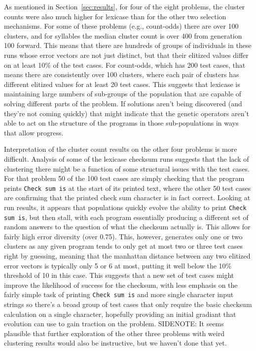As mentioned in Section~\ref{sec:results}, for four of the eight problems, the cluster counts were
also much higher for lexicase than for the other two selection mechanisms. For some of these problems
(e.g., count-odds) there are over 100 clusters, and for syllables the median cluster count is over 400
from generation 100 forward. This means that there are hundreds of groups of individuals in these runs
whose error vectors are not just distinct, but that their elitized values differ on at least 10\%
of the test cases. For count-odds, which has 200 test cases, that means there are consistently over
100 clusters, where each pair of clusters has different elitized values for at least 20 test cases.
This suggests that lexicase is maintaining large numbers of sub-groups of the population that are 
capable of solving different parts of the problem. If solutions aren't being discovered (and they're
not coming quickly) that might indicate that the genetic operators aren't able to act on the structure 
of the programs in those sub-populations in ways that allow progress.

Interpretation of the cluster count results on the other four problems is more difficult. Analysis
of some of the lexicase checksum runs suggests that the lack of clustering there might be a function
of some structural issues with the test cases. For that problem 50 of the 100 test cases are simply
checking that the program prints \texttt{Check sum is} at the start of its printed text, where the other
50 test cases are confirming that the printed check sum character is in fact correct. Looking at run
results, it appears that populations quickly evolve the ability to print \texttt{Check sum is}, but
then stall, with each program essentially producing a different set of random answers to the question
of what the checksum actually is. This allows for fairly high error diversity (over 0.75). This, however,
generates only one or two clusters as any given program tends to only get at most two or three test 
cases right by guessing, meaning that the manhattan distance between any two elitized error vectors
is typically only 5 or 6 at most, putting it well below the 10\% threshold of 10 in this case. This
suggests that a new set of test cases might improve the likelihood of success for the checksum, with
less emphasis on the fairly simple task of printing \texttt{Check sum is} and more single character
input strings so there's a broad group of test cases that only require the basic checksum calculation
on a single character, hopefully providing an initial gradiant that evolution can use to gain
traction on the problem.%
SIDENOTE: It seems plausible that further exploration of the other three
problems with weird clustering results would also be instructive, but we haven't done that yet.%


